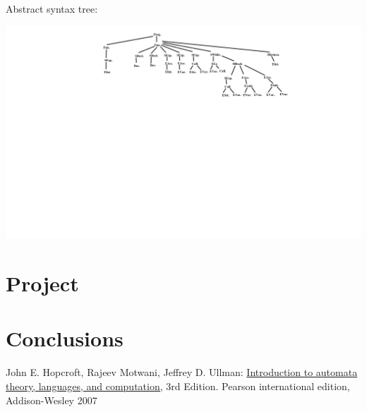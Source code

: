 \documentclass{article}
\theoremstyle{theorem}
\theoremstyle{definition}
\theoremstyle{remark}
\begin{document}
Abstract syntax tree:

\includegraphics[scale=0.3]{Images/FibAbstractTree.png}

\section{Project}

\section{Conclusions}\label{conclusions}

\begin{thebibliography}{99}
	John E. Hopcroft, Rajeev Motwani, Jeffrey D. Ullman:
\href{http://ce.sharif.edu/courses/94-95/1/ce414-2/resources/root/Text\%20Books/Automata/John\%20E.\%20Hopcroft,\%20Rajeev\%20Motwani,\%20Jeffrey\%20D.\%20Ullman-Introduction\%20to\%20Automata\%20Theory,\%20Languages,\%20and\%20Computations-Prentice\%20Hall\%20(2006).pdf}{Introduction to automata theory, languages, and computation,} 3rd Edition. Pearson international edition, Addison-Wesley 2007

\end{thebibliography}
\end{document}
